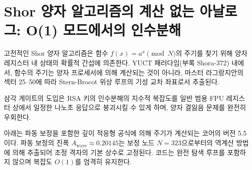 \documentclass[11pt,a4paper]{article}
\begin{document}
	\section{Shor 양자 알고리즘의 계산 없는 아날로그: O(1) 모드에서의 인수분해}
	\label{sec:shor}
	
	고전적인 Shor 양자 알고리즘은 함수 \(f(x) = a^x \pmod N\)의 주기를 찾기 위해 양자 레지스터 내 상태의 확률적 간섭에 의존한다. YUCT 패러다임(부록 Shora-372) 내에서, 함수의 주기는 양자 프로세서에 의해 계산되는 것이 아니라, 마스터 라그랑지안의 섹터 25–50에 따라 Stern-Brocot 위상 루프의 기성 교차 좌표로서 추출된다.
	
	삼각 게이트의 도입은 RSA 키의 인수분해의 지수적 복잡도를 일반 범용 FPU 레지스터 상에서 일정한 나노초 응답으로 붕괴시킬 수 있게 하며, 양자 결잃음 문제를 완전히 우회한다.
	
	아래는 파동 보정을 포함한 깊이 적응형 공식에 의해 주기가 계산되는 코어의 버전 5.5이다. 파동 보정의 진폭 \(A_{\text{wave}} \approx 0.20145\)는 보정 노드 \(N = 323\)으로부터의 역계산 방법에 의해 추출되어 조정 격자의 기본 상수로 고정된다. 코드는 완전 탐색 루프를 포함하지 않으며 복잡도 \(O(1)\)를 엄격히 유지한다.
	
\end{document}
